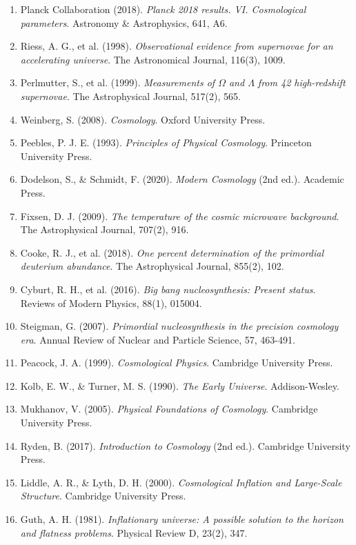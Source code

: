 \documentclass[a4paper, 11pt]{article}
\begin{document}
\begin{enumerate}
\item Planck Collaboration (2018). \textit{Planck 2018 results. VI. Cosmological parameters}.
Astronomy \& Astrophysics, 641, A6.
\item Riess, A. G., et al. (1998). \textit{Observational evidence from supernovae for an
accelerating universe}. The Astronomical Journal, 116(3), 1009.
\item Perlmutter, S., et al. (1999). \textit{Measurements of $\Omega$ and $\Lambda$ from 42
high-redshift supernovae}. The Astrophysical Journal, 517(2), 565.
\item Weinberg, S. (2008). \textit{Cosmology}. Oxford University Press.
\item Peebles, P. J. E. (1993). \textit{Principles of Physical Cosmology}. Princeton University Press.
\item Dodelson, S., \& Schmidt, F. (2020). \textit{Modern Cosmology} (2nd ed.). Academic Press.
\item Fixsen, D. J. (2009). \textit{The temperature of the cosmic microwave background}.
The Astrophysical Journal, 707(2), 916.
\item Cooke, R. J., et al. (2018). \textit{One percent determination of the primordial deuterium
abundance}. The Astrophysical Journal, 855(2), 102.
\item Cyburt, R. H., et al. (2016). \textit{Big bang nucleosynthesis: Present status}.
Reviews of Modern Physics, 88(1), 015004.
\item Steigman, G. (2007). \textit{Primordial nucleosynthesis in the precision cosmology era}.
Annual Review of Nuclear and Particle Science, 57, 463-491.
\item Peacock, J. A. (1999). \textit{Cosmological Physics}. Cambridge University Press.
\item Kolb, E. W., \& Turner, M. S. (1990). \textit{The Early Universe}. Addison-Wesley.
\item Mukhanov, V. (2005). \textit{Physical Foundations of Cosmology}. Cambridge University Press.
\item Ryden, B. (2017). \textit{Introduction to Cosmology} (2nd ed.). Cambridge University Press.
\item Liddle, A. R., \& Lyth, D. H. (2000). \textit{Cosmological Inflation and Large-Scale Structure}.
Cambridge University Press.
\item Guth, A. H. (1981). \textit{Inflationary universe: A possible solution to the horizon and
flatness problems}. Physical Review D, 23(2), 347.

\end{enumerate}
\end{document}
